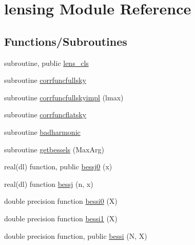 \hypertarget{namespacelensing}{}\section{lensing Module Reference}
\label{namespacelensing}
\subsection*{Functions/\+Subroutines}
\begin{DoxyCompactItemize}
\item 
subroutine, public \mbox{\hyperlink{namespacelensing_a71d315283bcce7fb9626733365bf43e6}{lens\+\_\+cls}}
\item 
subroutine \mbox{\hyperlink{namespacelensing_a18ba748aa475681b240cdd9be79dd809}{corrfuncfullsky}}
\item 
subroutine \mbox{\hyperlink{namespacelensing_ae3afbc47d14796e30a26538f38a726dd}{corrfuncfullskyimpl}} (lmax)
\item 
subroutine \mbox{\hyperlink{namespacelensing_aa3cc70dd58b493d3192e97f675ffa909}{corrfuncflatsky}}
\item 
subroutine \mbox{\hyperlink{namespacelensing_a68242ee3fa839802f6aed94e9f8dcf73}{badharmonic}}
\item 
subroutine \mbox{\hyperlink{namespacelensing_a208c6bffe402d39685fb2f4509de310c}{getbessels}} (Max\+Arg)
\item 
real(dl) function, public \mbox{\hyperlink{namespacelensing_a8fca1155759235e997ecc5ebcb8273bc}{bessj0}} (x)
\item 
real(dl) function \mbox{\hyperlink{namespacelensing_a53ac785c7d5c53f22122c476b62c4368}{bessj}} (n, x)
\item 
double precision function \mbox{\hyperlink{namespacelensing_a19d7fd08c1d4dc42d7e7aad518d14c7a}{bessi0}} (X)
\item 
double precision function \mbox{\hyperlink{namespacelensing_a2474483511401e2796af7b20caf6796d}{bessi1}} (X)
\item 
double precision function, public \mbox{\hyperlink{namespacelensing_a6849d58625a3e2cf0a2a22371141eb4a}{bessi}} (N, X)
\end{DoxyCompactItemize}
